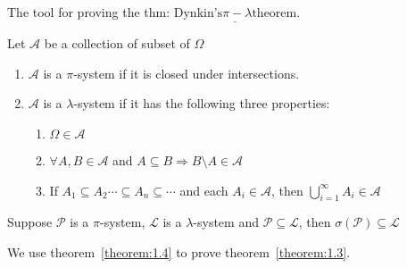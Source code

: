 \documentclass[11pt]{article}
\begin{document}
The tool for proving the thm: $\underline{\text{Dynkin's} \pi-\lambda \text{theorem}}$.

\begin{definition}
    Let $\mathcal{A}$ be a collection of subset of $\Omega$
    \begin{enumerate}
        \item $\mathcal{A}$ is a $\pi$-system if it is closed under intersections.
        \item $\mathcal{A}$ is a $\lambda$-system if it has the following three properties:
        \begin{enumerate}
            \item $\Omega \in \mathcal{A}$
            \item $\forall A,B \in \mathcal{A}$ and $A \subseteq B \Longrightarrow B \setminus A \in \mathcal{A}$
            \item If $A_1 \subseteq A_2 \cdots \subseteq A_n \subseteq 
            \cdots$ and each $A_{i} \in \mathcal{A}$, then
            $\bigcup_{i=1}^{\infty} A_{i} \in \mathcal{A}$
        \end{enumerate}
    \end{enumerate}
\end{definition}

\begin{theorem}
    \label{theorem:1.4}
    Suppose $\mathcal{P}$ is a $\pi$-system, $\mathcal{L}$ is a $\lambda$-system and $\mathcal{P} \subseteq \mathcal{L}$,
    then $\sigma(\mathcal{P}) \subseteq \mathcal{L}$
\end{theorem}

We use theorem~\ref{theorem:1.4} to prove theorem~\ref{theorem:1.3}.
\end{document}
